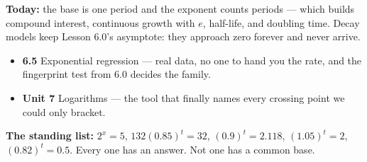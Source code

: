 \documentclass[aspectratio=169, 11pt]{beamer}
\begin{document}
\begin{frame}[t, plain]
  \textbf{Today:} the base is one period and the exponent counts periods --- which builds compound
  interest, continuous growth with $e$, half-life, and doubling time. Decay models keep Lesson 6.0's
  asymptote: they approach zero forever and never arrive.\\[8pt]
  \begin{itemize}\setlength{\itemsep}{3pt}
    \item \textbf{6.5} Exponential regression --- real data, no one to hand you the rate, and the
          fingerprint test from 6.0 decides the family.
    \item \textbf{Unit 7} Logarithms --- the tool that finally names every crossing point we could only
          bracket.
  \end{itemize}
  \vspace{6pt}
  \begin{center}
    \begin{minipage}{0.88\textwidth}
      {\footnotesize \textbf{The standing list:} $2^{x}=5$, \; $132(0.85)^{t}=32$, \;
      $(0.9)^{t}=2.118$, \; $(1.05)^{t}=2$, \; $(0.82)^{t}=0.5$. Every one has an answer. Not one has
      a common base.}
    \end{minipage}
  \end{center}
\end{frame}
\end{document}
